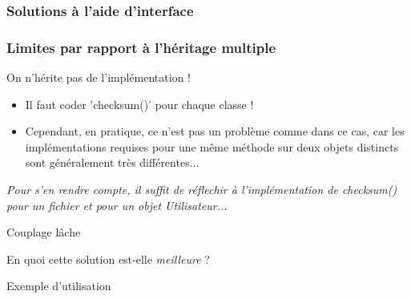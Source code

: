 \documentclass[handout]{beamer}
\begin{document}
\begin{frame}
	\frametitle{Solutions à l'aide d'interface}
	
\end{frame}

\begin{frame}
	\frametitle{Limites par rapport à l'héritage multiple}
	\begin{block}{On n'hérite pas de l'implémentation !}
		\begin{itemize}
			\item Il faut coder 'checksum()' pour chaque classe !
			\item Cependant, en pratique, ce n'est pas un problème comme dans ce cas, car les implémentations requises pour une même méthode sur deux objets distincts sont généralement très différentes...
		\end{itemize}
	\end{block}	
	
	\begin{center}
		\textit{Pour s'en rendre compte, il suffit de réflechir à l'implémentation de checksum() 
		pour un fichier et pour un objet Utilisateur...}
	\end{center}
\end{frame}

\begin{frame}
	\begin{block}{Couplage lâche}
		
	\end{block}
	\begin{center}
		En quoi cette solution est-elle \textit{meilleure} ?
	\end{center}
\end{frame}
\begin{frame}
	\begin{block}{Exemple d'utilisation}
		
	\end{block}
\end{frame}
\end{document}
